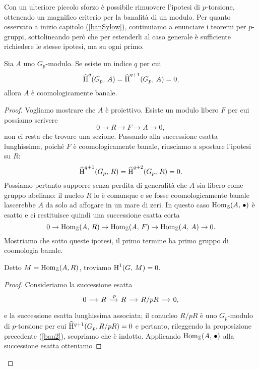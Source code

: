 Con un ulteriore piccolo sforzo è possibile rimuovere l'ipotesi di $ p $-torsione, ottenendo un magnifico criterio per la banalità di un modulo. Per quanto osservato a inizio capitolo (\ref{banSylow}), continuiamo a enunciare i teoremi per $ p $-gruppi, sottolineando però che per estenderli al caso generale è sufficiente richiedere le stesse ipotesi, ma su ogni primo.

\begin{theorem} \label{CriterioBanalita}
	Sia $ A $ uno $ G_p $-modulo. Se esiste un indice $ q $ per cui
	\[ \operatorname{\widehat{H}}^q(G_p, \, A) = \operatorname{\widehat{H}}^{q+1}(G_p, \, A) = 0, \]
	allora $ A $ è coomologicamente banale.
\end{theorem}

\begin{proof}
	Vogliamo mostrare che $ A $ è proiettivo. Esiste un modulo libero $ F $ per cui possiamo scrivere
	\begin{equation*}
		0 \to R \to F \to A \to 0,
	\end{equation*}
	non ci resta che trovare una sezione.
	Passando alla successione esatta lunghissima, poiché $ F $ è coomologicamente banale, riusciamo a spostare l'ipotesi su $ R $:
	\[ \operatorname{\widehat{H}}^{q+1}(G_p, \, R) = \operatorname{\widehat{H}}^{q+2}(G_p, \, R) = 0. \]
	Possiamo pertanto supporre senza perdita di generalità che $ A $ sia libero come gruppo abeliano: il nucleo $ R $ lo è comunque e se fosse coomologicamente banale lascerebbe $ A $ da solo ad affogare in un mare di zeri. In questo caso $ \operatorname{Hom}_{\mathbb{Z}}(A, \, \bullet) $ è esatto e ci restituisce quindi una successione esatta corta
	\begin{equation}\label{homban3}
		0 \to \operatorname{Hom}_{\mathbb{Z}}(A, \, R) \to \operatorname{Hom}_{\mathbb{Z}}(A, \, F) \to \operatorname{Hom}_{\mathbb{Z}}(A, \, A) \to 0.
	\end{equation}
	Mostriamo che sotto queste ipotesi, il primo termine ha primo gruppo di coomologia banale.
	\begin{lemma}
		Detto $ M = \operatorname{Hom}_{\mathbb{Z}}(A, R) $, troviamo $ \operatorname{H}^1(G, \, M) = 0 $.
	\end{lemma}
	\begin{proof}
		Consideriamo la successione esatta
		\begin{equation*}
		\begin{tikzcd}[column sep = small]
		0 \rar & R \rar["\cdot p"] & R \rar & R/pR \rar & 0,
		\end{tikzcd}
		\end{equation*}
		e la successione esatta lunghissima associata; il conucleo $ R/pR $ è uno $ G_p $-modulo di $ p $-torsione per cui $ \operatorname{\widehat{H}^{\mathnormal{q}+1}}(G_p, R/pR) = 0 $ e pertanto, rileggendo la proposizione precedente (\ref{ban2}), scopriamo che è indotto. Applicando $ \operatorname{Hom}_{\mathbb{Z}}(A, \, \bullet) $ alla successione esatta otteniamo

\end{proof}
\end{proof}
